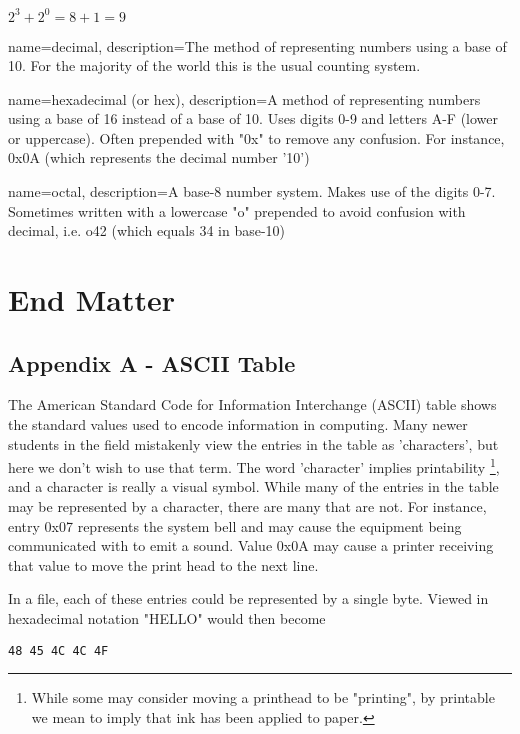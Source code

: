 \documentclass[11pt,fleqn]{book} %
\begin{document}
{$ 2^{3} + 2^{0} = 8 + 1 = 9 $

{
	name=decimal,
	description={The method of representing numbers using a base of 10.  For the majority of the world this is the usual counting system.}
}

{
	name=hexadecimal (or hex),
	description={A method of representing numbers using a base of 16 instead of a base of 10.  Uses digits 0-9 and letters A-F (lower or uppercase).  Often prepended with "0x" to remove any confusion.  For instance, 0x0A (which represents the decimal number '10')}
}

{
	name=octal,
	description={A base-8 number system.  Makes use of the digits 0-7.  Sometimes written with a lowercase "o" prepended to avoid confusion with decimal, i.e. o42 (which equals 34 in base-10)}
}
\part{End Matter}
\chapter*{Appendix A - ASCII Table}
\newcommand*{\thead}[1]{\multicolumn{1}{c}{\bfseries #1}}

The American Standard Code for Information Interchange (ASCII) table shows the standard values used to encode information in computing.  Many newer students in the field mistakenly view the entries in the table as 'characters', but here we don't wish to use that term.  The word 'character' implies printability \footnote{While some may consider moving a printhead to be "printing", by printable we mean to imply that ink has been applied to paper.}, and a character is really a visual symbol.  While many of the entries in the table may be represented by a character, there are many that are not.  For instance, entry 0x07 represents the system bell and may cause the equipment being communicated with to emit a sound.  Value 0x0A may cause a printer receiving that value to move the print head to the next line.

In a file, each of these entries could be represented by a single byte.  Viewed in hexadecimal notation "HELLO" would then become

\begin{verbatim}
48 45 4C 4C 4F
\end{verbatim}

}
\end{document}
